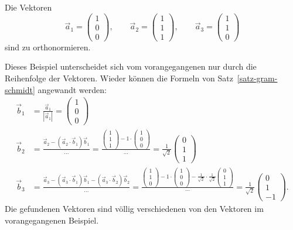 \begin{beispiel}
Die Vektoren
\[
\vec a_1=\begin{pmatrix}1\\0\\0\end{pmatrix},\qquad
\vec a_2=\begin{pmatrix}1\\1\\1\end{pmatrix},\qquad
\vec a_3=\begin{pmatrix}1\\1\\0\end{pmatrix}
\]
sind zu orthonormieren.

Dieses Beispiel unterscheidet sich vom vorangegangenen nur
durch die Reihenfolge der Vektoren.
Wieder können die Formeln von Satz~\ref{satz-gram-schmidt} angewandt werden:
\begin{align*}
\vec b_1&=\frac{\vec a_1}{|\vec a_1|}=\begin{pmatrix}1\\0\\0\end{pmatrix}
\\
\vec b_2
&=
\frac{\vec a_2-(\vec a_2\cdot \vec b_1)\vec b_1}{\dots}
=
\frac{\begin{pmatrix}1\\1\\1\end{pmatrix}-1\cdot\begin{pmatrix}1\\0\\0\end{pmatrix}}{\dots}=\frac1{\sqrt{2}}\begin{pmatrix}0\\1\\1\end{pmatrix}
\\
\vec b_3
&=
\frac{\vec a_3-(\vec a_3\cdot\vec b_1)\vec b_1-(\vec a_3\cdot\vec b_2)\vec b_2}{\dots}
=\frac{\displaystyle\begin{pmatrix}1\\1\\0\end{pmatrix}-1\cdot\begin{pmatrix}1\\0\\0\end{pmatrix}-\frac1{\sqrt{2}}\cdot\frac1{\sqrt{2}}\begin{pmatrix}0\\1\\1\end{pmatrix} }{\cdots}
=\frac{1}{\sqrt{2}}\begin{pmatrix}0\\1\\-1\end{pmatrix}.
\end{align*}
Die gefundenen Vektoren sind völlig verschiedenen von den Vektoren
im vorangegangenen Beispiel.
\end{beispiel}


